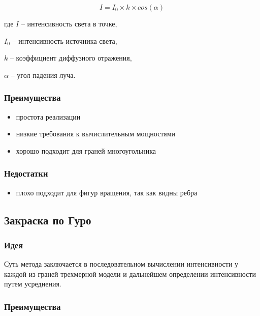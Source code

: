         \begin{equation}
          I = I_0 \times k \times cos(\alpha)
        \end{equation}
        
        где $I$ – интенсивность света в точке,
        
        $I_0$ – интенсивность источника света,
        
        $k$ – коэффициент диффузного отражения,
        
        $\alpha$ – угол падения луча.

      \subsubsection{Преимущества}
      
        \begin{itemize}
          \item простота реализации
          \item низкие требования к вычислительным мощностями
          \item хорошо подходит для граней многоугольника
        \end{itemize}
      
      \subsubsection{Недостатки}
      
        \begin{itemize}
          \item плохо подходит для фигур вращения, так как видны ребра
        \end{itemize}
        
    \subsection{Закраска по Гуро}
      
      \subsubsection{Идея}
      
        Суть метода заключается в последовательном вычислении интенсивности у каждой из граней трехмерной модели и дальнейшем определении интенсивности путем усреднения.
      
      \subsubsection{Преимущества}
      
